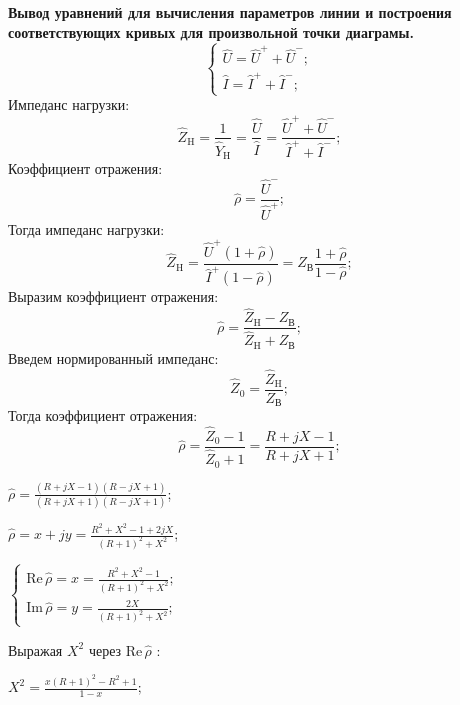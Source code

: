 \documentclass[12pt,a4paper]{article}
\newcommand{\ds}{\displaystyle}
\newcommand{\im}{\mathrm{Im}}
\newcommand{\re}{\mathrm{Re}}
\newcommand{\ro}{\hat{\rho}}
\newcommand{\zv}{Z_{\text{В}}}
\newcommand{\zn}{\hat{Z}_{\text{H}}}
\newcommand{\yn}{\hat{Y}_{\text{H}}}
\newcommand{\zz}{\hat{Z}_0}
\newcommand{\um}{\hat{U}^-}
\newcommand{\up}{\hat{U}^+}
\newcommand{\jm}{\hat{I}^-}
\newcommand{\jp}{\hat{I}^+}
\begin{document}
	\textbf{Вывод уравнений для вычисления параметров линии и построения соответствующих кривых для
	произвольной точки диаграмы.} \\
	\begin{equation}
		\begin{cases}
			\hat{U} = \up + \um; \\
			\hat{I} = \jp + \jm;
		\end{cases}
	\end{equation}
	Импеданс нагрузки:
	\begin{equation}
		\ds \zn = \frac1{\yn} = \frac{\hat{U}}{\hat{I}} = \frac{\up + \um}{\jp + \jm};
	\end{equation}
	Коэффициент отражения:
	\begin{equation}
		\ds \ro = \frac{\hat{U}^-}{\hat{U}^+};
	\end{equation} 
	Тогда импеданс нагрузки:
	\begin{equation}
		\ds \zn = \frac{\up(1+\ro)}{\jp(1-\ro)} = \zv \frac{1+\ro}{1-\ro};
	\end{equation} 
	Выразим коэффициент отражения:
	\begin{equation}
		\ro = \frac{\zn - \zv}{\zn + \zv};
	\end{equation} 
	Введем нормированный импеданс:
	\begin{equation}
		\zz = \frac{\zn}{\zv};
	\end{equation} 
	Тогда коэффициент отражения:
	\begin{equation}
		\ds \ro = \frac{\zz - 1}{\zz + 1} = \frac{R+jX-1}{R+jX+1};
	\end{equation}
	\begin{center}
		$\ds \ro = \frac{\left( R+jX-1 \right)\left( R-jX+1 \right)}{\left( R+jX+1 \right)
		\left( R-jX+1 \right)}$;
	\end{center}
	\begin{center}
		$\ds \ro = x+jy = \frac{R^2+X^2-1+2jX}{{(R+1)}^2+X^2}$;
	\end{center}
	\begin{center}
		$\begin{cases}
			\ds \re\,\ro = x = \frac{R^2+X^2-1}{{(R+1)}^2+X^2}; \\[12pt]
			\ds \im\,\ro = y = \frac{2X}{{(R+1)}^2+X^2};
		\end{cases}$
	\end{center}
	Выражая $X^2$ через $\re\,\ro$ :
	\begin{center}
		$\ds X^2 = \frac{x(R+1)^2-R^2+1}{1-x};$
	\end{center}
\end{document}

